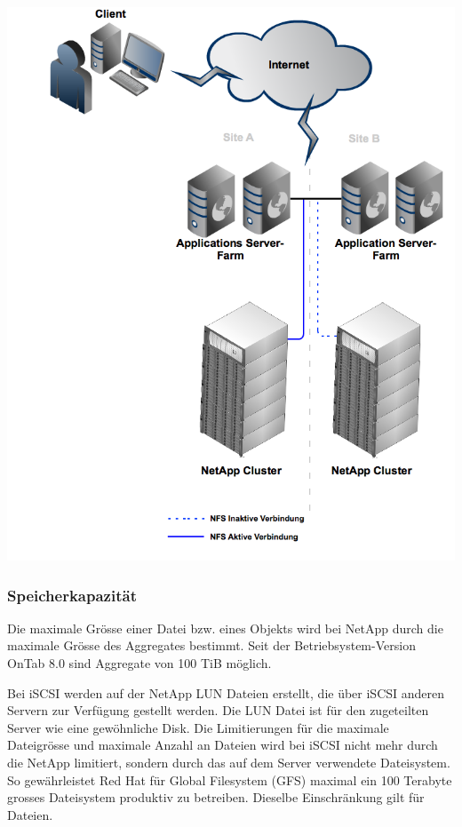 \begin{center}
\includegraphics[width=\linewidth, keepaspectratio = true]{media/NetAppNFS.png}
\end{center}

\subsubsection*{Speicherkapazität}
Die maximale Grösse einer Datei bzw. eines Objekts wird bei NetApp durch die maximale Grösse des Aggregates bestimmt. Seit der Betriebsystem-Version OnTab 8.0 sind Aggregate von 100 TiB möglich.

Bei iSCSI werden auf der NetApp LUN Dateien erstellt, die über iSCSI anderen Servern zur Verfügung gestellt werden. Die LUN Datei ist für den zugeteilten Server wie eine gewöhnliche Disk. Die Limitierungen für die maximale Dateigrösse und maximale Anzahl an Dateien wird bei iSCSI nicht mehr durch die NetApp limitiert, sondern durch das auf dem Server verwendete Dateisystem. So gewährleistet Red Hat für Global Filesystem (GFS) maximal ein 100 Terabyte grosses Dateisystem produktiv zu betreiben. Dieselbe Einschränkung gilt für Dateien. 

